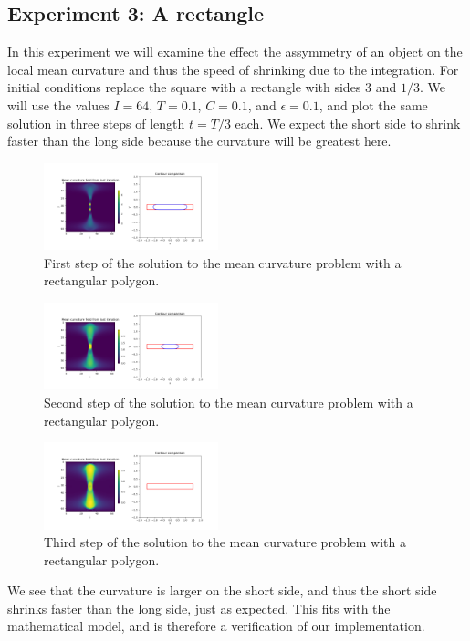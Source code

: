 \documentclass[acmtog]{acmart}
\begin{document}
\subsection{Experiment 3: A rectangle}
In this experiment we will examine the effect the assymmetry of an object on
the local mean curvature and thus the speed of shrinking due to the
integration. For initial conditions replace the square with a rectangle with
sides $3$ and $1/3$. We will use the values $I = 64$, $T = 0.1$, $C = 0.1$, and
$\epsilon = 0.1$, and plot the same solution in three steps of length $t = T/3$
each. We expect the short side to shrink faster than the long side because the
curvature will be greatest here.

\begin{figure}
  \centering
  \includegraphics[width=0.45\textwidth]{Images/mean_curvature/exp3_step_1.png}
  \caption{First step of the solution to the mean curvature problem with a rectangular polygon.\label{fig:exp3_step_1}}
\end{figure}
\begin{figure}
  \centering
  \includegraphics[width=0.45\textwidth]{Images/mean_curvature/exp3_step_2.png}
  \caption{Second step of the solution to the mean curvature problem with a rectangular polygon.\label{fig:exp3_step_2}}
\end{figure}
\begin{figure}
  \centering
  \includegraphics[width=0.45\textwidth]{Images/mean_curvature/exp3_step_3.png}
  \caption{Third step of the solution to the mean curvature problem with a rectangular polygon.\label{fig:exp3_step_3}}
\end{figure}

We see that the curvature is larger on the short side, and thus the short side
shrinks faster than the long side, just as expected. This fits with the
mathematical model, and is therefore a verification of our implementation.
\end{document}

